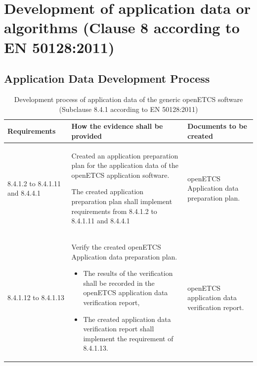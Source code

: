 \documentclass{template/openetcs_report}
\begin{document}
\section{Development of application data or algorithms (Clause 8 according to EN 50128:2011)}
\label{clause82}

\subsection{Application Data Development Process}
{\footnotesize\sffamily\centering
\begin{longtable}{|p{2cm}|p{9cm}|p{3cm}|}
\caption{Development process of application data of the generic openETCS software (Subclause 8.4.1 according to EN 50128:2011)}\\
\hline
\bfseries Requirements & \bfseries How the evidence shall be provided & \bfseries Documents to be created\\
\hline
\hline
\endhead
\hline
\endfoot

8.4.1.2 to 8.4.1.11 and 8.4.4.1 & Created an application preparation plan for the application data of the openETCS application software.

The created application preparation plan shall implement requirements from 8.4.1.2 to 8.4.1.11 and 8.4.4.1
& openETCS Application data preparation plan.\\ 
\hline
8.4.1.12 to 8.4.1.13 & Verify the created  openETCS Application data preparation plan.
\begin{itemize}\itemsep=0pt
  \item The results of the verification shall be recorded in the openETCS application data verification report,
  \item The created application data verification report shall implement the requirement of 8.4.1.13. 
\end{itemize}
& openETCS application data verification report.\\ 
\hline
\end{longtable}}
\end{document}
